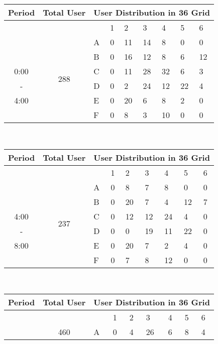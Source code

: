 \begin{table*}[hpt]	
\begin{minipage}{.5\linewidth}	
\centering	
\begin{tabular}{|c|c|p{0.4cm}|p{0.4cm}|p{0.4cm}|p{0.4cm}|p{0.4cm}|p{0.4cm}|p{0.4cm}|}	
\hline	
Period & Total User &\multicolumn{7}{c|}{User Distribution in 36 Grid} \\	
\hline	
&& & 1 &2 & 3 & 4 & 5&6\\	
\cline{3-9}	
 & \multirow{7}{*}{288}	
 &A	
& 0& 11& 14& 8& 0& 0  \\	
\cline{3-9}	
 && B	
& 0& 16& 12& 8& 6& 12  \\	
\cline{3-9}	
0:00 && C	
& 0& 11& 28& 32& 6& 3  \\	
\cline{3-9}	
 -&& D 	
& 0& 2& 24& 12& 22& 4  \\	
\cline{3-9}	
4:00 && E 	
& 0& 20& 6& 8& 2& 0  \\	
\cline{3-9}	
 && F 	
& 0& 8& 3& 10& 0& 0  \\	
\hline	
\end{tabular}	
\vspace*{0.1in} \\	
\begin{tabular}{|c|c|p{0.4cm}|p{0.4cm}|p{0.4cm}|p{0.4cm}|p{0.4cm}|p{0.4cm}|p{0.4cm}|}	
\hline	
Period & Total User &\multicolumn{7}{c|}{User Distribution in 36 Grid} \\	
\hline	
&& & 1 &2 & 3 & 4 & 5&6\\	
\cline{3-9}	
 & \multirow{7}{*}{237}	
 &A	
& 0& 8& 7& 8& 0& 0  \\	
\cline{3-9}	
 && B	
& 0& 20& 7& 4& 12& 7  \\	
\cline{3-9}	
4:00 && C	
& 0& 12& 12& 24& 4& 0  \\	
\cline{3-9}	
 -&& D 	
& 0& 0& 19& 11& 22& 0  \\	
\cline{3-9}	
8:00 && E 	
& 0& 20& 7& 2& 4& 0  \\	
\cline{3-9}	
 && F 	
& 0& 7& 8& 12& 0& 0  \\	
\hline	
\end{tabular}	
\vspace*{0.1in} \\	
\begin{tabular}{|c|c|p{0.4cm}|p{0.4cm}|p{0.4cm}|p{0.4cm}|p{0.4cm}|p{0.4cm}|p{0.4cm}|}	
\hline	
Period & Total User &\multicolumn{7}{c|}{User Distribution in 36 Grid} \\	
\hline	
&& & 1 &2 & 3 & 4 & 5&6\\	
\cline{3-9}	
 & \multirow{7}{*}{460}	
 &A	
& 0& 4& 26& 6& 8& 4  \\	

\end{tabular}
\end{minipage}
\end{table*}
